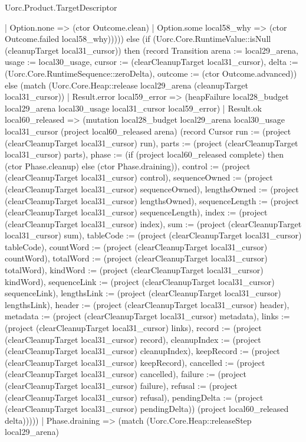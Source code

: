 \begin{lexlean}{Uorc.Product.TargetDescriptor}
\begin{semanticmodule}
{{      | Option.none => (ctor Outcome.clean)
      | Option.some local58_why => (ctor Outcome.failed local58_why)))})) else (if (Uorc.Core.RuntimeValue::isNull (cleanupTarget local31_cursor)) then (record Transition {arena := local29_arena, usage := local30_usage, cursor := (clearCleanupTarget local31_cursor), delta := (Uorc.Core.RuntimeSequence::zeroDelta), outcome := (ctor Outcome.advanced)}) else (match (Uorc.Core.Heap::release local29_arena (cleanupTarget local31_cursor))
      | Result.error local59_error => (heapFailure local28_budget local29_arena local30_usage local31_cursor local59_error)
      | Result.ok local60_released => (mutation local28_budget local29_arena local30_usage local31_cursor (project local60_released arena) (record Cursor {run := (project (clearCleanupTarget local31_cursor) run), parts := (project (clearCleanupTarget local31_cursor) parts), phase := (if (project local60_released complete) then (ctor Phase.cleanup) else (ctor Phase.draining)), control := (project (clearCleanupTarget local31_cursor) control), sequenceOwned := (project (clearCleanupTarget local31_cursor) sequenceOwned), lengthsOwned := (project (clearCleanupTarget local31_cursor) lengthsOwned), sequenceLength := (project (clearCleanupTarget local31_cursor) sequenceLength), index := (project (clearCleanupTarget local31_cursor) index), sum := (project (clearCleanupTarget local31_cursor) sum), tableCode := (project (clearCleanupTarget local31_cursor) tableCode), countWord := (project (clearCleanupTarget local31_cursor) countWord), totalWord := (project (clearCleanupTarget local31_cursor) totalWord), kindWord := (project (clearCleanupTarget local31_cursor) kindWord), sequenceLink := (project (clearCleanupTarget local31_cursor) sequenceLink), lengthsLink := (project (clearCleanupTarget local31_cursor) lengthsLink), header := (project (clearCleanupTarget local31_cursor) header), metadata := (project (clearCleanupTarget local31_cursor) metadata), links := (project (clearCleanupTarget local31_cursor) links), record := (project (clearCleanupTarget local31_cursor) record), cleanupIndex := (project (clearCleanupTarget local31_cursor) cleanupIndex), keepRecord := (project (clearCleanupTarget local31_cursor) keepRecord), cancelled := (project (clearCleanupTarget local31_cursor) cancelled), failure := (project (clearCleanupTarget local31_cursor) failure), refusal := (project (clearCleanupTarget local31_cursor) refusal), pendingDelta := (project (clearCleanupTarget local31_cursor) pendingDelta)}) (project local60_released delta)))))
    | Phase.draining => (match (Uorc.Core.Heap::releaseStep local29_arena)
}
\end{semanticmodule}
\end{lexlean}
